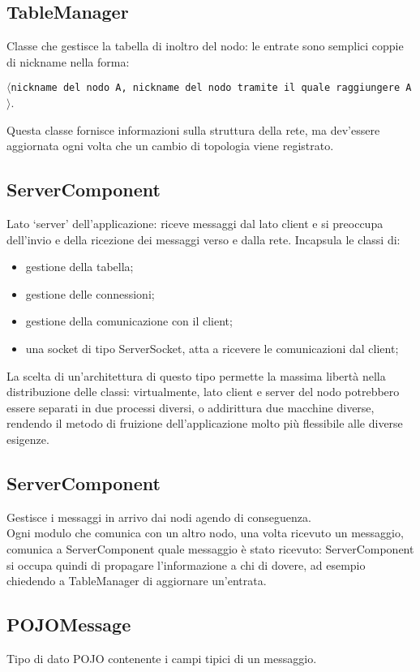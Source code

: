 \documentclass[10pt]{article} %
\begin{document}
\subsection{TableManager}
	Classe che gestisce la tabella di inoltro del nodo: le entrate sono semplici coppie di nickname nella forma:
	\begin{center} $\langle${\tt nickname del nodo A, nickname del nodo tramite il quale raggiungere A}$\rangle$. \end{center}
	Questa classe fornisce informazioni sulla struttura della rete, ma dev'essere aggiornata ogni volta che un cambio di topologia viene registrato.

\subsection{ServerComponent}
	Lato `server' dell'applicazione: riceve messaggi dal lato client e si preoccupa dell'invio e della ricezione dei messaggi verso e dalla rete. Incapsula le classi di:
	\begin{itemize}
		\item gestione della tabella;
		\item gestione delle connessioni;
		\item gestione della comunicazione con il client;
		\item una socket di tipo ServerSocket, atta a ricevere le comunicazioni dal client;
	\end{itemize}
	La scelta di un'architettura di questo tipo permette la massima libertà nella distribuzione delle classi: virtualmente, lato client e server del nodo potrebbero essere separati in due processi diversi, o addirittura due macchine diverse, rendendo il metodo di fruizione dell'applicazione molto più flessibile alle diverse esigenze.
	
\subsection{ServerComponent}
	Gestisce i messaggi in arrivo dai nodi agendo di conseguenza. \\
	Ogni modulo che comunica con un altro nodo, una volta ricevuto un messaggio, comunica a ServerComponent quale messaggio è stato ricevuto: ServerComponent si occupa quindi di propagare l'informazione a chi di dovere, ad esempio chiedendo a TableManager di aggiornare un'entrata.

\subsection{POJOMessage}
	Tipo di dato POJO contenente i campi tipici di un messaggio.
\end{document}

